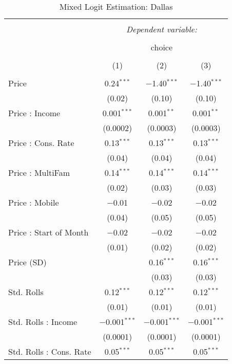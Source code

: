 
\begin{table}[!htbp] \centering 
  \caption{Mixed Logit Estimation: Dallas} 
  \label{tab:mnlDallasRandCoef} 
\begin{tabular}{@{\extracolsep{5pt}}lccc} 
\\[-1.8ex]\hline 
\hline \\[-1.8ex] 
 & \multicolumn{3}{c}{\textit{Dependent variable:}} \\ 
\cline{2-4} 
\\[-1.8ex] & \multicolumn{3}{c}{choice} \\ 
\\[-1.8ex] & (1) & (2) & (3)\\ 
\hline \\[-1.8ex] 
 Price & 0.24$^{***}$ & $-$1.40$^{***}$ & $-$1.40$^{***}$ \\ 
  & (0.02) & (0.10) & (0.10) \\ 
  Price : Income & 0.001$^{***}$ & 0.001$^{**}$ & 0.001$^{**}$ \\ 
  & (0.0002) & (0.0003) & (0.0003) \\ 
  Price : Cons. Rate & 0.13$^{***}$ & 0.13$^{***}$ & 0.13$^{***}$ \\ 
  & (0.04) & (0.04) & (0.04) \\ 
  Price : MultiFam & 0.14$^{***}$ & 0.14$^{***}$ & 0.14$^{***}$ \\ 
  & (0.02) & (0.03) & (0.03) \\ 
  Price : Mobile & $-$0.01 & $-$0.02 & $-$0.02 \\ 
  & (0.04) & (0.05) & (0.05) \\ 
  Price : Start of Month & $-$0.02 & $-$0.02 & $-$0.02 \\ 
  & (0.01) & (0.02) & (0.02) \\ 
  Price (SD) &  & 0.16$^{***}$ & 0.16$^{***}$ \\ 
  &  & (0.03) & (0.03) \\ 
  Std. Rolls & 0.12$^{***}$ & 0.12$^{***}$ & 0.12$^{***}$ \\ 
  & (0.01) & (0.01) & (0.01) \\ 
  Std. Rolls : Income & $-$0.001$^{***}$ & $-$0.001$^{***}$ & $-$0.001$^{***}$ \\ 
  & (0.0001) & (0.0001) & (0.0001) \\ 
  Std. Rolls : Cons. Rate & 0.05$^{***}$ & 0.05$^{***}$ & 0.05$^{***}$ \\ 

\end{tabular}
\end{table}
